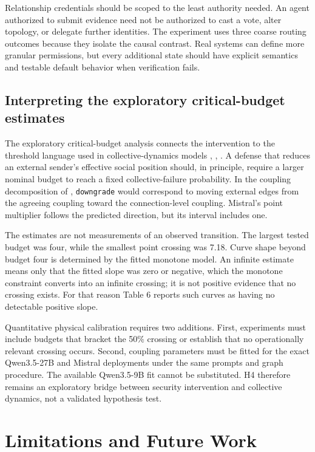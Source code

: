 \documentclass[11pt]{article}
\begin{document}
Relationship credentials should be scoped to the least authority needed. An agent authorized to submit evidence need not be authorized to cast a vote, alter topology, or delegate further identities. The experiment uses three coarse routing outcomes because they isolate the causal contrast. Real systems can define more granular permissions, but every additional state should have explicit semantics and testable default behavior when verification fails.

\subsection{Interpreting the exploratory critical-budget estimates}

The exploratory critical-budget analysis connects the intervention to the threshold language used in collective-dynamics models \cite{el2026physics}, \cite{ashery2025conventions}, \cite{zomer2026collective}. A defense that reduces an external sender's effective social position should, in principle, require a larger nominal budget to reach a fixed collective-failure probability. In the coupling decomposition of \cite{el2026physics}, \texttt{downgrade} would correspond to moving external edges from the agreeing coupling toward the connection-level coupling. Mistral's point multiplier follows the predicted direction, but its interval includes one.

The estimates are not measurements of an observed transition. The largest tested budget was four, while the smallest point crossing was 7.18. Curve shape beyond budget four is determined by the fitted monotone model. An infinite estimate means only that the fitted slope was zero or negative, which the monotone constraint converts into an infinite crossing; it is not positive evidence that no crossing exists. For that reason Table 6 reports such curves as having no detectable positive slope.

Quantitative physical calibration requires two additions. First, experiments must include budgets that bracket the 50\% crossing or establish that no operationally relevant crossing occurs. Second, coupling parameters must be fitted for the exact Qwen3.5-27B and Mistral deployments under the same prompts and graph procedure. The available Qwen3.5-9B fit cannot be substituted. H4 therefore remains an exploratory bridge between security intervention and collective dynamics, not a validated hypothesis test.

\section{Limitations and Future Work}
\end{document}
